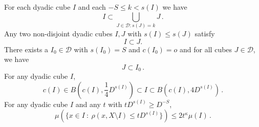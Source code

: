 For each dyadic cube $I$ and each $-S\le k<s(I)$ we have
\begin{equation}\label{coverdyadic}
I\subset \bigcup_{J\in \mathcal {D}: s(J)=k}J\, .
\end{equation}
Any two non-disjoint dyadic cubes $I,J$ with $s(I)\le s(J)$ satisfy
\begin{equation}\label{dyadicproperty}
I\subset J.
\end{equation}
There exists a $I_0 \in \mathcal{D}$ with $s(I_0) = S$ and $c(I_0) = o$
and for all cubes $J \in \mathcal{D}$, we have
\begin{equation}\label{subsetmaxcube}
    J \subset I_0\,.
\end{equation}
For any dyadic cube $I$,
 \begin{equation}
        \label{eq-vol-sp-cube}
        c(I)\in B(c(I), \frac{1}{4} D^{s(I)}) \subset I \subset B(c(I), 4 D^{s(I)})\,.
    \end{equation}
For any dyadic cube $I$ and any $t$ with $tD^{s(I)} \ge D^{-S}$,
\begin{equation}
    \label{eq-small-boundary}
    \mu(\{x \in I \ : \ \rho(x, X \setminus I) \leq t D^{s(I)}\}) \le 2 t^\kappa \mu(I)\,.
\end{equation}



